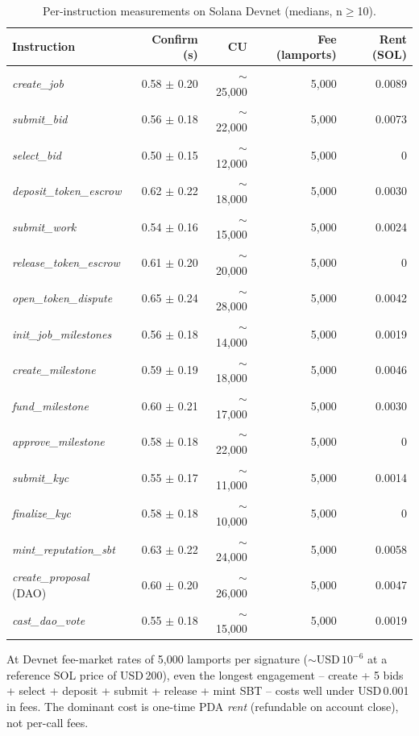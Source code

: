 \begin{table}[H]
\centering
\caption{Per-instruction measurements on Solana Devnet (medians, n$\geq$10).}
\label{table:perf}
\small
\begin{tabular}{|l|r|r|r|r|}
\hline
\textbf{Instruction} & \textbf{Confirm (s)} & \textbf{CU} & \textbf{Fee (lamports)} & \textbf{Rent (SOL)} \\ \hline
\emph{create\_job} & 0.58 $\pm$ 0.20 & $\sim$25{,}000 & 5{,}000 & 0.0089 \\ \hline
\emph{submit\_bid} & 0.56 $\pm$ 0.18 & $\sim$22{,}000 & 5{,}000 & 0.0073 \\ \hline
\emph{select\_bid} & 0.50 $\pm$ 0.15 & $\sim$12{,}000 & 5{,}000 & 0 \\ \hline
\emph{deposit\_token\_escrow} & 0.62 $\pm$ 0.22 & $\sim$18{,}000 & 5{,}000 & 0.0030 \\ \hline
\emph{submit\_work} & 0.54 $\pm$ 0.16 & $\sim$15{,}000 & 5{,}000 & 0.0024 \\ \hline
\emph{release\_token\_escrow} & 0.61 $\pm$ 0.20 & $\sim$20{,}000 & 5{,}000 & 0 \\ \hline
\emph{open\_token\_dispute} & 0.65 $\pm$ 0.24 & $\sim$28{,}000 & 5{,}000 & 0.0042 \\ \hline
\emph{init\_job\_milestones} & 0.56 $\pm$ 0.18 & $\sim$14{,}000 & 5{,}000 & 0.0019 \\ \hline
\emph{create\_milestone} & 0.59 $\pm$ 0.19 & $\sim$18{,}000 & 5{,}000 & 0.0046 \\ \hline
\emph{fund\_milestone} & 0.60 $\pm$ 0.21 & $\sim$17{,}000 & 5{,}000 & 0.0030 \\ \hline
\emph{approve\_milestone} & 0.58 $\pm$ 0.18 & $\sim$22{,}000 & 5{,}000 & 0 \\ \hline
\emph{submit\_kyc} & 0.55 $\pm$ 0.17 & $\sim$11{,}000 & 5{,}000 & 0.0014 \\ \hline
\emph{finalize\_kyc} & 0.58 $\pm$ 0.18 & $\sim$10{,}000 & 5{,}000 & 0 \\ \hline
\emph{mint\_reputation\_sbt} & 0.63 $\pm$ 0.22 & $\sim$24{,}000 & 5{,}000 & 0.0058 \\ \hline
\emph{create\_proposal} (DAO) & 0.60 $\pm$ 0.20 & $\sim$26{,}000 & 5{,}000 & 0.0047 \\ \hline
\emph{cast\_dao\_vote} & 0.55 $\pm$ 0.18 & $\sim$15{,}000 & 5{,}000 & 0.0019 \\ \hline
\end{tabular}
\end{table}

\noindent At Devnet fee-market rates of 5{,}000 lamports per signature ($\sim$USD\,$10^{-6}$ at a reference SOL price of USD\,200), even the longest engagement -- create + 5 bids + select + deposit + submit + release + mint SBT -- costs well under USD\,0.001 in fees. The dominant cost is one-time PDA \emph{rent} (refundable on account close), not per-call fees.

